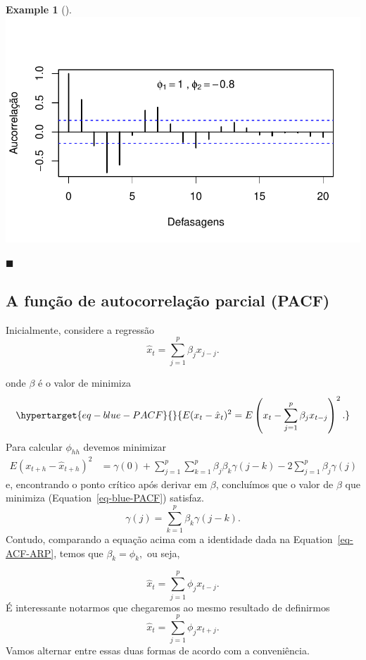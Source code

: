 \documentclass[
  letterpaper,
  DIV=11,
  numbers=noendperiod]{scrartcl}
\theoremstyle{plain}
\theoremstyle{plain}
\theoremstyle{definition}
\newtheorem{example}{Example}[chapter]
\theoremstyle{definition}
\theoremstyle{remark}
\begin{document}
\begin{example}[]
\includegraphics{processo_linear_geral_files/figure-pdf/unnamed-chunk-2-1.pdf}

\(\blacksquare\)

\end{example}

\hypertarget{a-funuxe7uxe3o-de-autocorrelauxe7uxe3o-parcial-pacf}{%
\subsection{A função de autocorrelação parcial
(PACF)}\label{a-funuxe7uxe3o-de-autocorrelauxe7uxe3o-parcial-pacf}}

Inicialmente, considere a regressão
\[\hat{x}_t=\sum_{j=1}^p \beta_j x_{j-j}.\]

onde \(\beta\) é o valor de minimiza
\begin{equation}\protect\hypertarget{eq-blue-PACF}{}{E(x_t-\hat{x}_t)^2=E\left(x_t-\sum_{j=1}^p \beta_jx_{t-j}\right)^2.}\label{eq-blue-PACF}\end{equation}
Para calcular \(\phi_{hh}\) devemos minimizar
\[\begin{align}E(x_{t+h}-\hat{x}_{t+h})^2&=\gamma(0)+\sum_{j=1}^p\sum_{k=1}^p\beta_j\beta_k \gamma(j-k)-2\sum_{j=1}^p\beta_j\gamma(j)\end{align}\]
e, encontrando o ponto crítico após derivar em \(\beta\), concluímos que
o valor de \(\beta\) que minimiza (Equation~\ref{eq-blue-PACF})
satisfaz. \[\gamma(j)=\sum_{k=1}^p \beta_k\gamma(j-k).\] Contudo,
comparando a equação acima com a identidade dada na
Equation~\ref{eq-ACF-ARP}, temos que \(\beta_k=\phi_k,\) ou seja,

\[\hat{x}_t=\sum_{j=1}^p\phi_jx_{t-j}.\] É interessante notarmos que
chegaremos ao mesmo resultado de definirmos
\[\hat{x}_t=\sum_{j=1}^p \phi_j x_{t+j}.\] Vamos alternar entre essas
duas formas de acordo com a conveniência.
\end{document}
